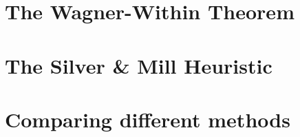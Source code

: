 \section{The Wagner-Within Theorem}

\section{The Silver \& Mill Heuristic}

\section{Comparing different methods}
